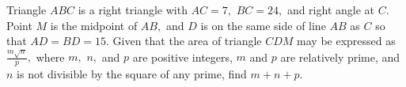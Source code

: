 Triangle $ABC$ is a right triangle with $AC=7,$ $BC=24,$ and right angle at $C.$ Point $M$ is the midpoint of $AB,$ and $D$ is on the same side of line $AB$ as $C$ so that $AD=BD=15.$ Given that the area of triangle $CDM$ may be expressed as $\frac{m\sqrt{n}}{p},$ where $m,$ $n,$ and $p$ are positive integers, $m$ and $p$ are relatively prime, and $n$ is not divisible by the square of any prime, find $m+n+p.$